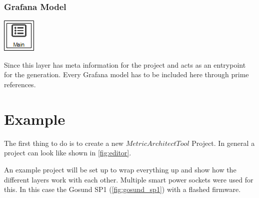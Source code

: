 \subsubsection{Grafana Model}
\noindent\begin{minipage}{0.15\textwidth}%
	\includegraphics[width=\linewidth]{assets/images/project}
\end{minipage}%
\hfill%
\begin{minipage}{0.8\textwidth}
	Since this layer has meta information for the project and acts as an entrypoint for the generation. Every Grafana model has to be included here through prime references.
\end{minipage}

\section{Example}

The first thing to do is to create a new $MetricArchitectTool$ Project. In general a project can look like shown in \cref{fig:editor}.  

An example project will be set up to wrap everything up and show how the different layers work with each other. Multiple smart power sockets were used for this. In this case the Gosund SP1 (\cref{fig:gosund_sp1}) with a flashed firmware. 

